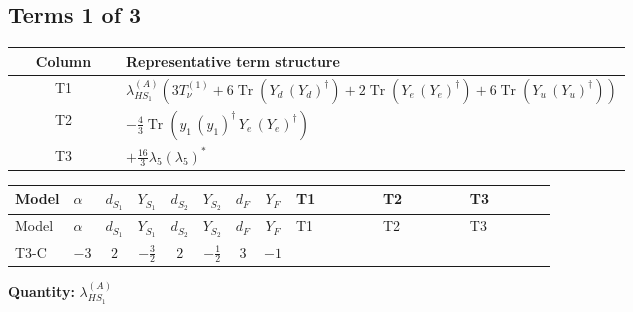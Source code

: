 \documentclass[8pt]{article}
\begin{document}
\begin{landscape}
\subsection*{Terms 1 of 3}
\begin{center}
\begin{tabular}{@{}c >{\raggedright\arraybackslash}p{0.82\linewidth}@{}}
\toprule
Column & Representative term structure \\
\midrule
T1 & \(\displaystyle {\lambda_{HS_1}^{(A)}} (3 T_{\nu}^{(1)}+6 \operatorname{Tr}\!\left({Y_d}\,\left({Y_d}\right)^{\dagger}\right)+2 \operatorname{Tr}\!\left({Y_e}\,\left({Y_e}\right)^{\dagger}\right)+6 \operatorname{Tr}\!\left({Y_u}\,\left({Y_u}\right)^{\dagger}\right))\) \\
\midrule
T2 & \(\displaystyle -\frac{4}{3} \operatorname{Tr}\!\left({y_1}\,\left({y_1}\right)^{\dagger}\,{Y_e}\,\left({Y_e}\right)^{\dagger}\right)\) \\
\midrule
T3 & \(\displaystyle +\frac{16}{3} {\lambda_5} \left({\lambda_5}\right)^{*}\) \\
\midrule
\bottomrule
\end{tabular}
\end{center}
\smallskip
\tiny
\begin{longtable}{@{}llcccccc >{\raggedright\arraybackslash}p{0.21\linewidth} >{\raggedright\arraybackslash}p{0.21\linewidth} >{\raggedright\arraybackslash}p{0.21\linewidth}@{}}
\toprule
Model & $\alpha$ & $d_{S_1}$ & $Y_{S_1}$ & $d_{S_2}$ & $Y_{S_2}$ & $d_F$ & $Y_F$ & T1 & T2 & T3 \\
\midrule
\endfirsthead
\toprule
Model & $\alpha$ & $d_{S_1}$ & $Y_{S_1}$ & $d_{S_2}$ & $Y_{S_2}$ & $d_F$ & $Y_F$ & T1 & T2 & T3 \\
\midrule
\endhead
T3-C & $-3$ & $2$ & $-\frac{3}{2}$ & $2$ & $-\frac{1}{2}$ & $3$ & $-1$ & \scriptsize\adjustbox{max width=\linewidth}{$\begin{gathered} {\lambda_{HS_1}^{(A)}} (3 T_{\nu}^{(1)}+6 \operatorname{Tr}\!\left({Y_d}\,\left({Y_d}\right)^{\dagger}\right)+2 \operatorname{Tr}\!\left({Y_e}\,\left({Y_e}\right)^{\dagger}\right)+6 \operatorname{Tr}\!\left({Y_u}\,\left({Y_u}\right)^{\dagger}\right))\end{gathered}$} & \scriptsize\adjustbox{max width=\linewidth}{$\begin{gathered} -\frac{4}{3} \operatorname{Tr}\!\left({y_1}\,\left({y_1}\right)^{\dagger}\,{Y_e}\,\left({Y_e}\right)^{\dagger}\right)\end{gathered}$} & \scriptsize\adjustbox{max width=\linewidth}{$\begin{gathered} +\frac{16}{3} {\lambda_5} \left({\lambda_5}\right)^{*}\end{gathered}$} \\
\midrule
\bottomrule
\end{longtable}
\clearpage
\noindent\textbf{Quantity: }$\lambda_{HS_1}^{(A)}$\par\smallskip

\end{landscape}
\end{document}
